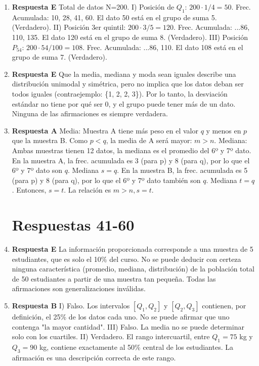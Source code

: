 \documentclass[11pt]{article}
\begin{document}
\begin{enumerate}
    \item \textbf{Respuesta E} Total de datos N=200. I) Posición de $Q_1$: $200 \cdot 1/4 = 50$. Frec. Acumulada: 10, 28, 41, 60. El dato 50 está en el grupo de suma 5. (Verdadero). II) Posición 3er quintil: $200 \cdot 3/5 = 120$. Frec. Acumulada: ...86, 110, 135. El dato 120 está en el grupo de suma 8. (Verdadero). III) Posición $P_{54}$: $200 \cdot 54/100 = 108$. Frec. Acumulada: ...86, 110. El dato 108 está en el grupo de suma 7. (Verdadero). %
    
    \item \textbf{Respuesta E} Que la media, mediana y moda sean iguales describe una distribución unimodal y simétrica, pero no implica que los datos deban ser todos iguales (contraejemplo: \{1, 2, 2, 3\}). Por lo tanto, la desviación estándar no tiene por qué ser 0, y el grupo puede tener más de un dato. Ninguna de las afirmaciones es siempre verdadera. %
    
    \item \textbf{Respuesta A} Media: Muestra A tiene más peso en el valor $q$ y menos en $p$ que la muestra B. Como $p<q$, la media de A será mayor: $m>n$. Mediana: Ambas muestras tienen 12 datos, la mediana es el promedio del 6º y 7º dato. En la muestra A, la frec. acumulada es 3 (para p) y 8 (para q), por lo que el 6º y 7º dato son $q$. Mediana $s=q$. En la muestra B, la frec. acumulada es 5 (para p) y 8 (para q), por lo que el 6º y 7º dato también son $q$. Mediana $t=q$. Entonces, $s=t$. La relación es $m>n, s=t$. %
    
    \section{Respuestas 41-60}
    \item \textbf{Respuesta E} La información proporcionada corresponde a una muestra de 5 estudiantes, que es solo el 10\% del curso. No se puede deducir con certeza ninguna característica (promedio, mediana, distribución) de la población total de 50 estudiantes a partir de una muestra tan pequeña. Todas las afirmaciones son generalizaciones inválidas. %

    \item \textbf{Respuesta B} I) Falso. Los intervalos $[Q_1, Q_2]$ y $[Q_2, Q_3]$ contienen, por definición, el 25\% de los datos cada uno. No se puede afirmar que uno contenga "la mayor cantidad". III) Falso. La media no se puede determinar solo con los cuartiles. II) Verdadero. El rango intercuartil, entre $Q_1=75$ kg y $Q_3=90$ kg, contiene exactamente al 50\% central de los estudiantes. La afirmación es una descripción correcta de este rango. %
    

\end{enumerate}
\end{document}
